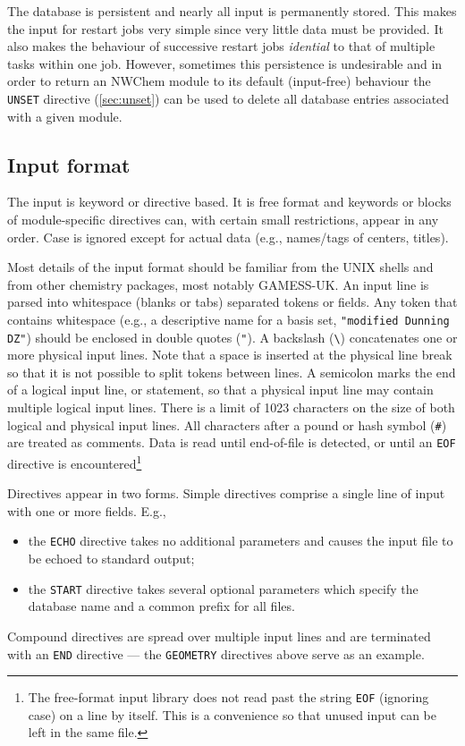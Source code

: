 \fussy

The database is persistent and nearly all input is permanently stored.
This makes the input for restart jobs very simple since very little
data must be provided.  It also makes the behaviour of successive
restart jobs {\em idential} to that of multiple tasks within one job.
However, sometimes this persistence is undesirable and in order to
return an NWChem module to its default (input-free) behaviour the
\verb+UNSET+ directive (\ref{sec:unset}) can be used to delete all
database entries associated with a given module.

\subsection{Input format}

The input is keyword or directive based.  It is free format and
keywords or blocks of module-specific directives can, with certain
small restrictions, appear in any order.  Case is ignored except
for actual data (e.g., names/tags of centers, titles).

Most details of the input format should be familiar from the UNIX
shells and from other chemistry packages, most notably GAMESS-UK.  An
input line is parsed into whitespace (blanks or tabs) separated tokens
or fields.  Any token that contains whitespace (e.g., a descriptive
name for a basis set, \verb+"modified Dunning DZ"+) should be enclosed
in double quotes (\verb+"+).  A backslash (\verb+\+) concatenates one
or more physical input lines. Note that a space is inserted at the
physical line break so that it is not possible to split tokens between
lines.  A semicolon marks the end of a logical input line, or
statement, so that a physical input line may contain multiple logical
input lines.  There is a limit of 1023 characters on the size of both
logical and physical input lines.  All characters after a pound or
hash symbol (\verb+#+) are treated as comments.  Data is read until
end-of-file is detected, or until an \verb+EOF+ directive is
encountered\footnote{The
  free-format input library does not read past the string \verb+EOF+
  (ignoring case) on a line by itself.  This is a convenience so that
  unused input can be left in the same file.}

Directives appear in two forms.  Simple directives comprise a single
line of input with one or more fields.  E.g., 
\begin{itemize}
\item the \verb+ECHO+ directive takes no additional parameters 
  and causes the input file to be echoed to standard output;
\item the \verb+START+ directive takes several optional
      parameters which specify the database name and a common prefix
      for all files.
\end{itemize}
Compound directives are spread over multiple input lines and
are terminated with an \verb+END+ directive --- the 
\verb+GEOMETRY+ directives above serve as an example. 

